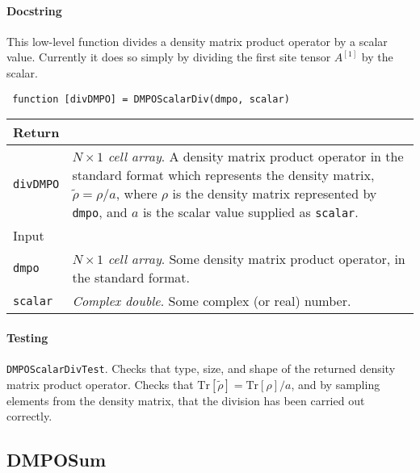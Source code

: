  \paragraph{Docstring} This low-level function divides a density matrix product operator by a scalar value. Currently it does so simply by dividing the first site tensor \(A^{[1]}\) by the scalar.
 \begin{lstlisting}
 function [divDMPO] = DMPOScalarDiv(dmpo, scalar) \end{lstlisting}
 \begin{longtabu}{X[1,l]X[4,l]}
 \hline
 Return & \\ \hline
 \lstinline$divDMPO$ & \emph{\(N \times 1\) cell array}. A density matrix product operator in the standard format which represents the density matrix, \(\tilde{\rho} = \rho / a\), where \(\rho\) is the density matrix represented by \lstinline$dmpo$, and \(a\) is the scalar value supplied as \lstinline$scalar$. \\ \hline
 Input & \\ \hline
 \lstinline$dmpo$ & \emph{\(N \times 1\) cell array}. Some density matrix product operator, in the standard format. \\
 \lstinline$scalar$ & \emph{Complex double}. Some complex (or real) number. \\
 \hline
 \end{longtabu}
 \paragraph{Testing} \lstinline$DMPOScalarDivTest$. Checks that type, size, and shape of the returned density matrix product operator. Checks that \(\mathrm{Tr}[\tilde{\rho}] = \mathrm{Tr}[\rho] / a\), and by sampling elements from the density matrix, that the division has been carried out correctly.

 \subsection{DMPOSum}
